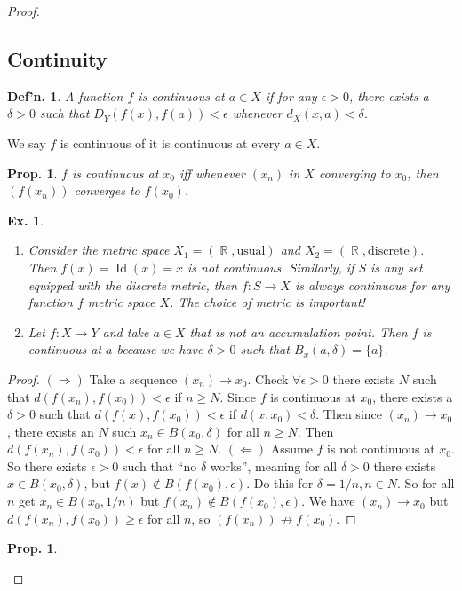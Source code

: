 \documentclass[12pt, a4paper]{book}
\DeclareMathOperator{\R}{\mathbb{R}}
\DeclareMathOperator{\Id}{Id}
\newtheorem{definition}[theorem]{Def'n.}
\newtheorem{proposition}[theorem]{Prop.}
\newtheorem{example}[theorem]{Ex.}
\theoremstyle{nonumberplain}
\newtheorem{proof}{Proof}
\begin{document}
\begin{proof}
\subsection{Continuity}
\begin{definition}
    A function $f$ is continuous at $a\in X$ if for any $\epsilon>0$, there exists a $\delta>0$ such that $D_Y(f(x),f(a))<\epsilon$
    whenever $d_X(x,a)<\delta$.
\end{definition}
We say $f$ is continuous of it is continuous at every $a\in X$.
\begin{proposition}
    $f$ is continuous at $x_0$ iff whenever $(x_n)$ in $X$ converging to $x_0$, then $(f(x_n))$ converges to $f(x_0)$.
\end{proposition}
\begin{example}
    \begin{enumerate}
        \item Consider the metric space $X_1=(\R,\text{usual})$ and $X_2=(\R,\text{discrete})$. Then $f(x)=\Id(x)=x$
            is not continuous. Similarly, if $S$ is any set equipped with the discrete metric, then $f:S\to X$ is
            always continuous for any function $f$ metric space $X$. The choice of metric is important!
        \item Let $f:X\to Y$ and take $a\in X$ that is not an accumulation point. Then $f$ is continuous at $a$ because
            we have $\delta>0$ such that $B_x(a,\delta)=\{a\}$.
    \end{enumerate}
\end{example}
\begin{proof}
    $(\Rightarrow)$ Take a sequence $(x_n)\to x_0$. Check $\forall\epsilon>0$ there exists $N$ such that $d(f(x_n),f(x_0))<\epsilon$
    if $n\geq N$. Since $f$ is continuous at $x_0$, there exists a $\delta>0$ such that $d(f(x),f(x_0))<\epsilon$ if $d(x,x_0)<\delta$.
    Then since $(x_n)\to x_0$, there exists an $N$ such $x_n\in B(x_0,\delta)$ for all $n\geq N$. Then $d(f(x_n),f(x_0))<\epsilon$
    for all $n\geq N$.
    $(\Leftarrow)$ Assume $f$ is not continuous at $x_0$. So there exists $\epsilon>0$ such that ``no $\delta$ works'',
    meaning for all $\delta>0$ there exists $x\in B(x_0,\delta)$, but $f(x)\notin B(f(x_0),\epsilon)$. Do this for
    $\delta=1/n,n\in N$. So for all $n$ get $x_n\in B(x_0,1/n)$ but $f(x_n)\notin B(f(x_0),\epsilon)$. We have $(x_n)\to x_0$
    but $d(f(x_n),f(x_0))\geq\epsilon$ for all $n$, so $(f(x_n))\not\to f(x_0)$.
\end{proof}
\begin{proposition}

\end{proposition}
\end{proof}
\end{document}
